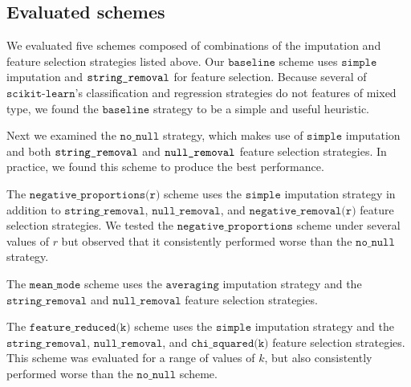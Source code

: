 \documentclass{article} %
\begin{document}


\subsection{Evaluated schemes}
\label{sec:evaluatedschemes}

We evaluated five schemes composed of combinations of the imputation and feature selection strategies listed above. Our $\texttt{baseline}$ scheme uses $\texttt{simple}$ imputation and $\texttt{string\textunderscore removal}$ for feature selection. Because several of $\texttt{scikit-learn}$'s classification and regression strategies do not features of mixed type, we found the $\texttt{baseline}$ strategy to be a simple and useful heuristic.

Next we examined the $\texttt{no\_null}$ strategy, which makes use of $\texttt{simple}$ imputation and both $\texttt{string\textunderscore removal}$ and $\texttt{null\textunderscore removal}$ feature selection strategies. In practice, we found this scheme to produce the best performance.

The $\texttt{negative\_proportions(r)}$ scheme uses the $\texttt{simple}$ imputation strategy in addition to $\texttt{string\_removal}$, $\texttt{null\_removal}$, and $\texttt{negative\_removal(r)}$ feature selection strategies. We tested the $\texttt{negative\_proportions}$ scheme under several values of $r$ but observed that it consistently performed worse than the $\texttt{no\_null}$ strategy.

The $\texttt{mean\_mode}$ scheme uses the $\texttt{averaging}$ imputation strategy and the $\texttt{string\_removal}$ and $\texttt{null\_removal}$ feature selection strategies.

The $\texttt{feature\_reduced(k)}$ scheme uses the $\texttt{simple}$ imputation strategy and the $\texttt{string\_removal}$, $\texttt{null\_removal}$, and $\texttt{chi\_squared(k)}$ feature selection strategies. This scheme was evaluated for a range of values of $k$, but also consistently performed worse than the $\texttt{no\_null}$ scheme.
\end{document}
